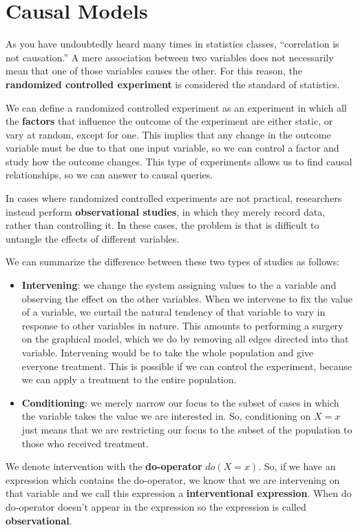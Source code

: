 \chapter{Causal Models}
As you have undoubtedly heard many times in statistics classes, “correlation is
not causation.” A mere association between two variables does not necessarily
mean that one of those variables causes the other. For this reason, the
\textbf{randomized controlled experiment} is considered the standard of statistics.

We can define a randomized controlled experiment as an experiment in which all
the \textbf{factors} that influence the outcome of the experiment are either
static, or vary at random, except for one. This implies that any change in the
outcome variable must be due to that one input variable, so we can control a factor
and study how the outcome changes. This type of experiments allows us to find causal
relationships, so we can answer to causal queries.

In cases where randomized controlled experiments are not practical, researchers
instead perform \textbf{observational studies}, in which they merely record data,
rather than controlling it. In these cases, the problem is that is difficult to
untangle the effects of different variables.

We can summarize the difference between these two types of studies as follows:
\begin{itemize}
      \item \textbf{Intervening}: we change the system assigning values to the a
            variable and observing the effect on the other variables. When we
            intervene to fix the value of a variable, we curtail the natural
            tendency of that variable to vary in response to other variables in
            nature. This amounts to performing a surgery on the graphical model,
            which we do by removing all edges directed into that variable.
            Intervening would be to take the whole population and give everyone
            treatment. This is possible if we can control the experiment, because
            we can apply a treatment to the entire population.
      \item \textbf{Conditioning}: we merely narrow our focus to the subset of
            cases in which the variable takes the value we are interested in.
            So, conditioning on $X = x$ just means that we are restricting our
            focus to the subset of the population to those who received treatment.
\end{itemize}
We denote intervention with the \textbf{do-operator} $do(X=x)$. So, if we have
an expression which contains the do-operator, we know that we are intervening
on that variable and we call this expression a \textbf{interventional expression}.
When do do-operator doesn't appear in the expression so the expression is called
\textbf{observational}.

